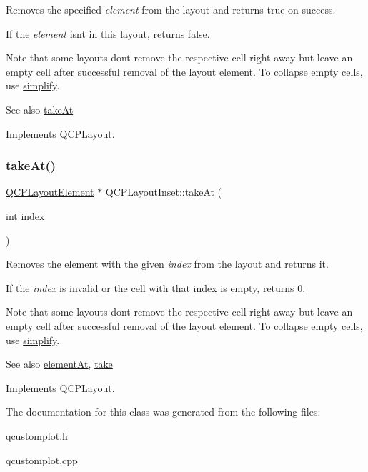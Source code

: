 Removes the specified {\itshape element} from the layout and returns true on success.

If the {\itshape element} isn\textquotesingle{}t in this layout, returns false.

Note that some layouts don\textquotesingle{}t remove the respective cell right away but leave an empty cell after successful removal of the layout element. To collapse empty cells, use \hyperlink{classQCPLayoutInset_a18b7d508f0baa60cc5dcb1343cf7f32a}{simplify}.

\begin{DoxySeeAlso}{See also}
\hyperlink{classQCPLayoutInset_abf2e8233f5b7051220907e62ded490a2}{take\+At} 
\end{DoxySeeAlso}


Implements \hyperlink{classQCPLayout_ada26cd17e56472b0b4d7fbbc96873e4c}{Q\+C\+P\+Layout}.

\mbox{\label{classQCPLayoutInset_abf2e8233f5b7051220907e62ded490a2}} 
\subsubsection{\texorpdfstring{take\+At()}{takeAt()}}
{\footnotesize\ttfamily \hyperlink{classQCPLayoutElement}{Q\+C\+P\+Layout\+Element} $\ast$ Q\+C\+P\+Layout\+Inset\+::take\+At (\begin{DoxyParamCaption}\item[{int}]{index }\end{DoxyParamCaption})\hspace{0.3cm}{\ttfamily [virtual]}}

Removes the element with the given {\itshape index} from the layout and returns it.

If the {\itshape index} is invalid or the cell with that index is empty, returns 0.

Note that some layouts don\textquotesingle{}t remove the respective cell right away but leave an empty cell after successful removal of the layout element. To collapse empty cells, use \hyperlink{classQCPLayoutInset_a18b7d508f0baa60cc5dcb1343cf7f32a}{simplify}.

\begin{DoxySeeAlso}{See also}
\hyperlink{classQCPLayoutInset_a881ca205605bae9c034733b808f93a02}{element\+At}, \hyperlink{classQCPLayoutInset_af7f13cc369f8190b5e7e17d5f39dfe1c}{take} 
\end{DoxySeeAlso}


Implements \hyperlink{classQCPLayout_a5a79621fa0a6eabb8b520cfc04fb601a}{Q\+C\+P\+Layout}.



The documentation for this class was generated from the following files\+:\begin{DoxyCompactItemize}
\item 
qcustomplot.\+h\item 
qcustomplot.\+cpp\end{DoxyCompactItemize}
